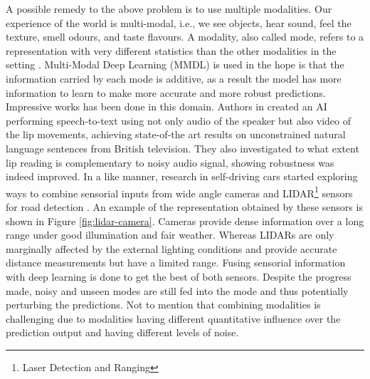 A possible remedy to the above problem is to use multiple modalities. Our experience of the world is multi-modal, i.e., we see objects, hear sound, feel the texture, smell odours, and taste flavours. A modality, also called mode, refers to a representation with very different statistics than the other modalities in the setting \citep{taxomany-multimodal}. Multi-Modal Deep Learning (MMDL) is used in the hope is that the information carried by each mode is additive, as a result the model has more information to learn to make more accurate and more robust predictions. Impressive works has been done in this domain. Authors in \citep{afouras} created an AI performing speech-to-text using not only audio of the speaker but also video of the lip movements, achieving state-of-the art results on unconstrained natural language sentences from British television. They also investigated to what extent lip reading is complementary to noisy audio signal, showing robustness was indeed improved. In a like manner, research in self-driving cars started exploring ways to combine sensorial inputs from wide angle cameras and LIDAR\footnote{Laser Detection and Ranging} sensors for road detection \citep{lidar-camera}. An example of the representation obtained by these sensors is shown in Figure \ref{fig:lidar-camera}. Cameras provide dense information over a long range under good illumination and fair weather. Whereas LIDARs are only marginally affected by the external lighting conditions and provide accurate distance measurements but have a limited range. Fusing sensorial information with deep learning is done to get the best of both sensors. Despite the progress made, noisy and unseen modes are still fed into the mode and thus potentially perturbing the predictions. Not to mention that combining modalities is challenging due to modalities having different quantitative influence over the prediction output and having different levels of noise. 

